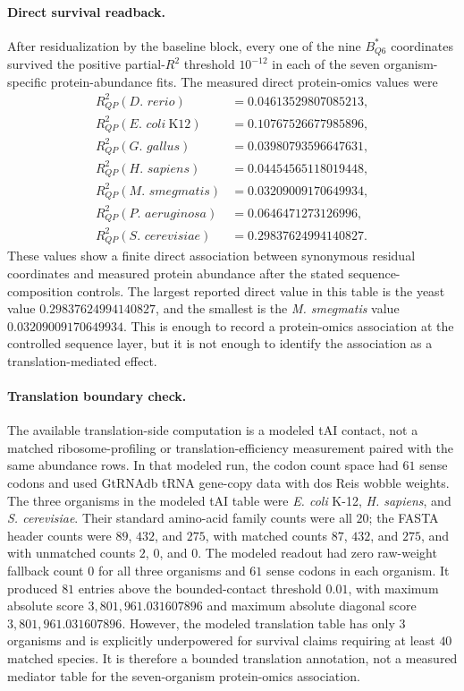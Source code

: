 \paragraph{Direct survival readback.}
After residualization by the baseline block, every one of the nine $B^{*}_{Q6}$ coordinates survived the positive partial-$R^2$ threshold $10^{-12}$ in each of the seven organism-specific protein-abundance fits. The measured direct protein-omics values were
$$
\begin{aligned}
R^2_{QP}(\textit{D. rerio}) &= 0.04613529807085213,\\
R^2_{QP}(\textit{E. coli}\ \mathrm{K12}) &= 0.10767526677985896,\\
R^2_{QP}(\textit{G. gallus}) &= 0.03980793596647631,\\
R^2_{QP}(\textit{H. sapiens}) &= 0.04454565118019448,\\
R^2_{QP}(\textit{M. smegmatis}) &= 0.03209009170649934,\\
R^2_{QP}(\textit{P. aeruginosa}) &= 0.0646471273126996,\\
R^2_{QP}(\textit{S. cerevisiae}) &= 0.29837624994140827.
\end{aligned}
$$
These values show a finite direct association between synonymous residual coordinates and measured protein abundance after the stated sequence-composition controls. The largest reported direct value in this table is the yeast value $0.29837624994140827$, and the smallest is the \textit{M. smegmatis} value $0.03209009170649934$. This is enough to record a protein-omics association at the controlled sequence layer, but it is not enough to identify the association as a translation-mediated effect.

\paragraph{Translation boundary check.}
The available translation-side computation is a modeled tAI contact, not a matched ribosome-profiling or translation-efficiency measurement paired with the same abundance rows. In that modeled run, the codon count space had $61$ sense codons and used GtRNAdb tRNA gene-copy data with dos Reis wobble weights. The three organisms in the modeled tAI table were \textit{E. coli} K-12, \textit{H. sapiens}, and \textit{S. cerevisiae}. Their standard amino-acid family counts were all $20$; the FASTA header counts were $89$, $432$, and $275$, with matched counts $87$, $432$, and $275$, and with unmatched counts $2$, $0$, and $0$. The modeled readout had zero raw-weight fallback count $0$ for all three organisms and $61$ sense codons in each organism. It produced $81$ entries above the bounded-contact threshold $0.01$, with maximum absolute score $3{,}801{,}961.031607896$ and maximum absolute diagonal score $3{,}801{,}961.031607896$. However, the modeled translation table has only $3$ organisms and is explicitly underpowered for survival claims requiring at least $40$ matched species. It is therefore a bounded translation annotation, not a measured mediator table for the seven-organism protein-omics association.

